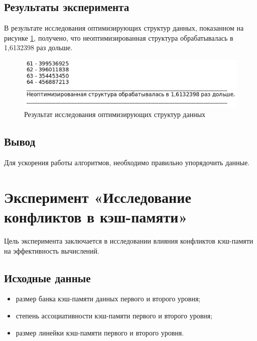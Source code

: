 \section{Результаты эксперимента}

В результате исследования оптимизирующих структур данных, показанном на рисунке \ref{img:read_result}, получено, что неоптимизированная структура обрабатывалась в 1,6132398 раз дольше.

\begin{figure}[H]
	\begin{center}
		\includegraphics[scale=0.4]{img/read_result.png}
	\end{center}
	\captionsetup{justification=centering}
	\caption{Результат исследования оптимизирующих структур данных}
	\label{img:read_result}
\end{figure}

\section{Вывод}

Для ускорения работы алгоритмов, необходимо правильно упорядочить данные.

\chapter{Эксперимент «Исследование конфликтов в кэш-памяти»}

Цель эксперимента заключается в исследовании влияния конфликтов кэш-памяти на эффективность вычислений.

\section{Исходные данные}

\begin{itemize}
	\item размер банка кэш-памяти данных первого и второго уровня;
	\item степень ассоциативности кэш-памяти первого и второго уровня;
	\item размер линейки кэш-памяти первого и второго уровня.
\end{itemize}

